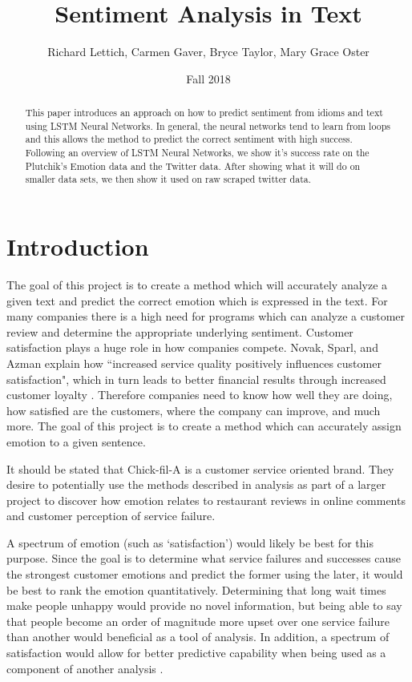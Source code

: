\documentclass[titlepage,letterpaper]{article}
\title{Sentiment Analysis in Text}
\author{Richard Lettich, Carmen Gaver, Bryce Taylor, Mary Grace Oster}
\date{Fall 2018}
\begin{document}
\maketitle

\begin{abstract}
This paper introduces an approach on how to predict sentiment from idioms and text using LSTM Neural Networks. In general, the neural networks tend to learn from loops and this allows the method to predict the correct sentiment with high success. Following an overview of LSTM Neural Networks, we show it's success rate on the Plutchik's Emotion data and the Twitter data. After showing what it will do on smaller data sets, we then show it used on raw scraped twitter data. \\
\end{abstract}

\section{Introduction}

The goal of this project is to create a method which will accurately analyze a given text and predict the correct emotion which is expressed in the text. For many companies there is a high need for programs which can analyze a customer review and determine the appropriate underlying sentiment. Customer satisfaction plays a huge role in how companies compete. Novak, Sparl, and Azman explain how ``increased service quality positively influences customer satisfaction", which in turn leads to better financial results through increased customer loyalty \cite{BusinessCustomerSatisfaction}. Therefore companies need to know how well they are doing, how satisfied are the customers, where the company can improve, and much more. The goal of this project is to create a method which can accurately assign emotion to a given sentence.

It should be stated that Chick-fil-A is a customer service oriented brand. They desire to potentially use the methods described in analysis as part of a larger project to discover how emotion relates to restaurant reviews in online comments and customer perception of service failure.

A spectrum of emotion (such as `satisfaction') would likely be best for this purpose. Since the goal is to determine what service failures and successes cause the strongest customer emotions and predict the former using the later, it would be best to rank the emotion quantitatively. Determining that long wait times make people unhappy would provide no novel information, but being able to say that people become an order of magnitude more upset over one service failure than another would beneficial as a tool of analysis. In addition, a spectrum of satisfaction would allow for better predictive capability when being used as a component of another analysis \cite{low}.
\end{document}
